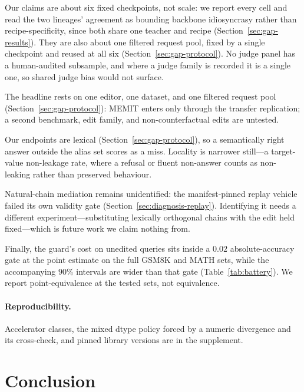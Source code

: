\documentclass[letterpaper]{article} %
\begin{document}
Our claims are about six fixed checkpoints, not scale: we report every cell and read the two lineages' agreement as bounding backbone idiosyncrasy rather than recipe-specificity, since both share one teacher and recipe (Section~\ref{sec:gap-results}).  They are also about one filtered request pool, fixed by a single checkpoint and reused at all six (Section~\ref{sec:gap-protocol}).  No judge panel has a human-audited subsample, and where a judge family is recorded it is a single one, so shared judge bias would not surface.

The headline rests on one editor, one dataset, and one filtered request pool (Section~\ref{sec:gap-protocol}): MEMIT enters only through the transfer replication; a second benchmark, edit family, and non-counterfactual edits are untested.

Our endpoints are lexical (Section~\ref{sec:gap-protocol}), so a semantically right answer outside the alias set scores as a miss.  Locality is narrower still---a target-value non-leakage rate, where a refusal or fluent non-answer counts as non-leaking rather than preserved behaviour.

Natural-chain mediation remains unidentified: the manifest-pinned replay vehicle failed its own validity gate (Section~\ref{sec:diagnosis-replay}).  Identifying it needs a different experiment---substituting lexically orthogonal chains with the edit held fixed---which is future work we claim nothing from.

Finally, the guard's cost on unedited queries sits inside a \(0.02\) absolute-accuracy gate at the point estimate on the full GSM8K \citep{cobbe2021gsm8k} and MATH \citep{hendrycks2021math} sets, while the accompanying \(90\%\) intervals are wider than that gate (Table~\ref{tab:battery}).  We report point-equivalence at the tested sets, not equivalence. %

\paragraph{Reproducibility.} Accelerator classes, the mixed dtype policy forced by a numeric divergence and its cross-check, and pinned library versions are in the supplement.

\section{Conclusion}
\label{sec:conclusion}
\end{document}

